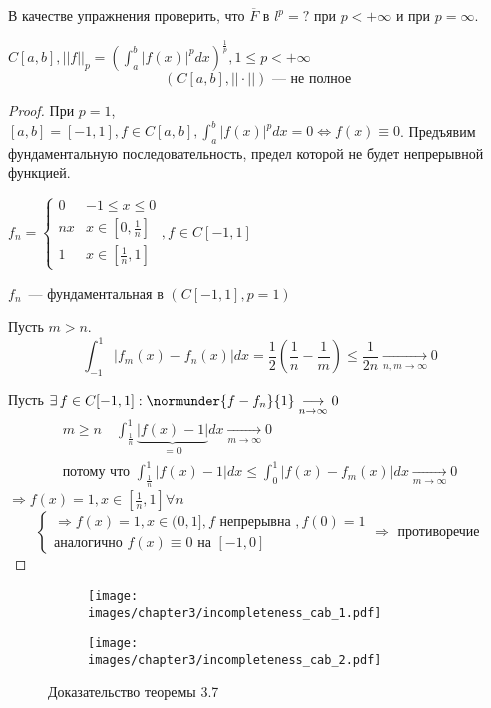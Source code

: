 \documentclass[document]{subfiles}
\begin{document}
В качестве упражнения проверить, что $\overline{F}$ в $l^p = ? $ при $p < + \infty$ и при $p = \infty$.
\begin{theorem}
    $C[a,b], ||f||_p = \left( \int^b_a |f(x)|^p dx \right)^{\frac{1}{p}}, 1 \leq p < + \infty$
    \[ (C[a,b], || \cdot || ) \text {~--- не полное } \]
\end{theorem}
\begin{proof}
    При $p = 1$, $[a,b] = [-1,1], f \in C[a,b], \int^b_a |f(x)|^p dx = 0 \Leftrightarrow f(x) \equiv 0$.
    Предъявим фундаментальную последовательность, предел которой не будет непрерывной функцией.

    $f_n = \begin{cases}
        0 & -1 \leq x \leq 0 \\
        nx & x \in [0, \frac{1}{n}] \\
        1 & x \in [\frac{1}{n}, 1]
    \end{cases}, f \in C[-1,1]$ %

    $f_n$~--- фундаментальная в $(C[-1,1], p=1)$

    Пусть $ m > n$. %
    \[ \int_{-1}^1 |f_m(x) - f_n(x)| dx = \frac{1}{2} \left( \frac{1}{n} - \frac{1}{m} \right) \leq \frac{1}{2n} \underset{n, m \to \infty}{\longrightarrow} 0 \]

    Пусть $\exists \, f \in C[-1,1] : \normunder{f-f_n}{1} \underset{n \to \infty}{\longrightarrow} 0$ 
    \begin{gather*}
        m \geq n \quad \int^1_{\frac{1}{n}} \underbrace{|f(x) - 1|}_{=0} dx  \underset{m \to \infty}{\longrightarrow} 0  \\
        \text{потому что }\int^1_{\frac{1}{n}} {|f(x) - 1|} dx \leq \int^1_0 |f(x) - f_m(x)|dx \underset{m \to \infty}{\longrightarrow} 0
    \end{gather*}
    $\Rightarrow f(x) = 1, x \in \left[ \frac{1}{n}, 1 \right] \forall n $\\
    \[ \begin{cases}
       \Rightarrow f(x) = 1, x \in (0,1], f \text{ непрерывна }, f(0) = 1\\
        \text{аналогично } f(x) \equiv 0 \text{ на } [-1,0]
    \end{cases} \Rightarrow \text{ противоречие } \]
\end{proof}
\begin{figure}
    \begin{subfigure}{0.40\textwidth}
        \texttt{[image: images/chapter3/incompleteness\_cab\_1.pdf]}
    \end{subfigure}
    \begin{subfigure}{0.40\textwidth}
        \texttt{[image: images/chapter3/incompleteness\_cab\_2.pdf]}
    \end{subfigure}
    \caption{Доказательство теоремы 3.7}
\end{figure}
\end{document}
